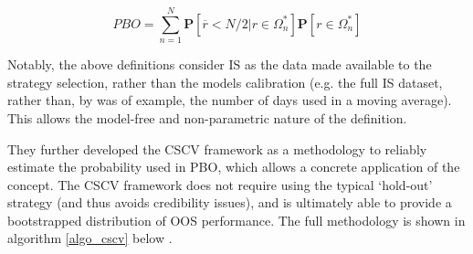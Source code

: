 \documentclass[a4paper,11pt,oneside]{article}
\theoremstyle{plain}
\theoremstyle{definition}
\begin{document}
	\begin{equation}\label{eq:PBO2}
	PBO = \sum_{n=1}^{N}\mathbf{P}[\overline{r} < {N/2}|r\in\Omega_{n}^{*}]\mathbf{P}[r\in\Omega_{n}^{*}]
	\end{equation}
	
	Notably, the above definitions consider IS as the data made available to the strategy selection, rather than the 
	models calibration (e.g. the full IS dataset, rather than, by was of example, the number of days used in a moving average). 
	This allows the model-free and non-parametric nature of the definition. 
	\hfill \break 
	
	They further developed the CSCV framework as a methodology to reliably estimate the probability used in PBO, which allows a concrete application of the concept. The CSCV framework does not require using the typical ‘hold-out’ strategy (and thus avoids credibility issues), and is ultimately able to provide a bootstrapped distribution of OOS performance. The full methodology is shown in algorithm \ref{algo_cscv} below \cite{BailyPBO}.
	\hfill \break 
	
\end{document}
